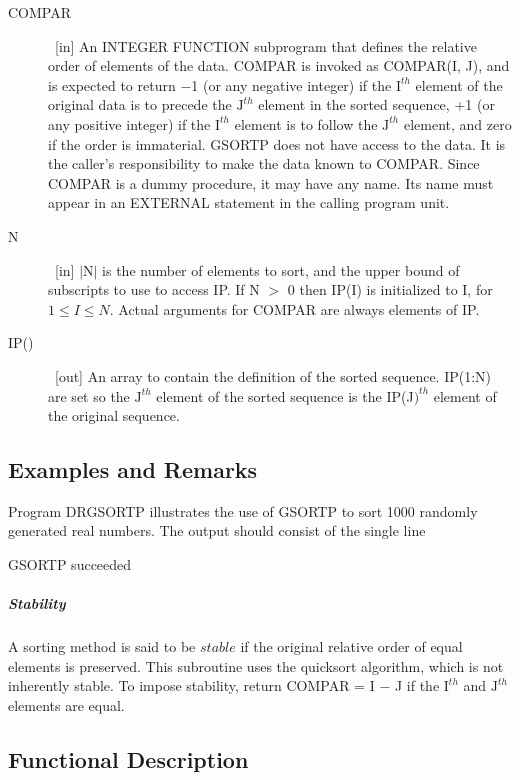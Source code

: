\documentclass[twoside]{MATH77}
\begin{document}
\begin{description}

\item[COMPAR] \ [in] An INTEGER FUNCTION subprogram that defines the relative
order of elements of the data. COMPAR is invoked as COMPAR(I, J), and is
expected to return $-$1 (or any negative integer) if the $\text{I}^{th}$
element of the original data is to precede the $\text{J}^{th}$ element in
the sorted sequence, +1 (or any positive integer)
if the $\text{I}^{th}$ element is to follow the $\text{J}^{th}$ element,
and zero if the order is immaterial. GSORTP does not have access to the
data. It is the caller's responsibility to make the data known to COMPAR.
Since COMPAR is a dummy procedure, it may have any name. Its name must
appear in an EXTERNAL statement in the calling program unit.

\item[N] \ [in] $|$N$|$ is the number of elements to sort, and the upper
 bound of subscripts to use to access IP.  If N $>$ 0 then IP(I) is
 initialized to I, for $1 \leq I \leq N$.  Actual arguments for COMPAR
 are always elements of IP.

\item[IP()] \ [out] An array to contain the definition of the sorted
sequence. IP(1:N) are set so the $\text{J}^{th}$ element of the sorted sequence
is the IP(J$)^{th}$ element of the original sequence.
\end{description}

\subsection{Examples and Remarks}

Program DRGSORTP illustrates the use of GSORTP to sort 1000 randomly
generated real numbers. The output should consist of the single line

\hspace{.2in}GSORTP succeeded

\subparagraph{Stability}

A sorting method is said to be $stable$ if the original relative order of
equal elements is preserved. This subroutine uses the quicksort algorithm,
which is not inherently stable. To impose stability, return COMPAR =
I $-$ J if the $\text{I}^{th}$ and $\text{J}^{th}$ elements are equal.

\subsection{Functional Description}
\end{document}
